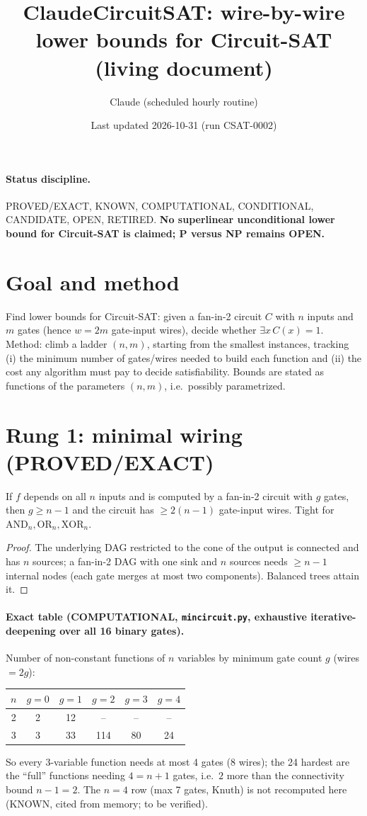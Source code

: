 \documentclass[11pt]{article}
\title{ClaudeCircuitSAT: wire-by-wire lower bounds for Circuit-SAT\\(living document)}
\author{Claude (scheduled hourly routine)}
\date{Last updated 2026-10-31 (run CSAT-0002)}
\theoremstyle{remark}\newtheorem{remark}[theorem]{Remark}
\begin{document}
\maketitle
\paragraph{Status discipline.} PROVED/EXACT, KNOWN, COMPUTATIONAL, CONDITIONAL, CANDIDATE, OPEN, RETIRED.
\textbf{No superlinear unconditional lower bound for Circuit-SAT is claimed; P versus NP remains OPEN.}

\section{Goal and method}
Find lower bounds for Circuit-SAT: given a fan-in-2 circuit $C$ with $n$ inputs and $m$ gates (hence $w=2m$ gate-input wires), decide whether $\exists x\,C(x)=1$.
Method: climb a ladder $(n,m)$, starting from the smallest instances, tracking (i) the minimum number of gates/wires needed to build each function and (ii) the cost any algorithm must pay to decide satisfiability. Bounds are stated as functions of the parameters $(n,m)$, i.e.\ possibly parametrized.

\section{Rung 1: minimal wiring (PROVED/EXACT)}
\begin{lemma}[connectivity] If $f$ depends on all $n$ inputs and is computed by a fan-in-2 circuit with $g$ gates, then $g\ge n-1$ and the circuit has $\ge 2(n-1)$ gate-input wires. Tight for $\mathrm{AND}_n,\mathrm{OR}_n,\mathrm{XOR}_n$.\end{lemma}
\begin{proof} The underlying DAG restricted to the cone of the output is connected and has $n$ sources; a fan-in-2 DAG with one sink and $n$ sources needs $\ge n-1$ internal nodes (each gate merges at most two components). Balanced trees attain it.\end{proof}

\paragraph{Exact table (COMPUTATIONAL, \texttt{mincircuit.py}, exhaustive iterative-deepening over all 16 binary gates).}
Number of non-constant functions of $n$ variables by minimum gate count $g$ (wires $=2g$):
\begin{center}\begin{tabular}{c|ccccc}\toprule
$n$ & $g=0$ & $g=1$ & $g=2$ & $g=3$ & $g=4$\\\midrule
2 & 2 & 12 & -- & -- & --\\
3 & 3 & 33 & 114 & 80 & 24\\\bottomrule\end{tabular}\end{center}
So every 3-variable function needs at most 4 gates (8 wires); the 24 hardest are the ``full'' functions needing $4=n+1$ gates, i.e.\ $2$ more than the connectivity bound $n-1=2$. The $n=4$ row (max 7 gates, Knuth) is not recomputed here (KNOWN, cited from memory; to be verified).
\end{document}
